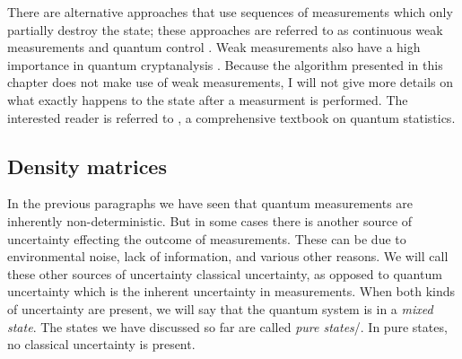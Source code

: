 There are alternative approaches that use sequences of measurements which only partially destroy the state; these approaches are referred to as continuous weak measurements and quantum control \citep{Smith2006}. Weak measurements also have a high importance in quantum cryptanalysis \citep{Pryde2004}. Because the algorithm presented in this chapter does not make use of weak measurements, I will not give more details on what exactly happens to the state after a measurment is performed. The interested reader is referred to \citep{Petz2008}, a comprehensive textbook on quantum statistics.

\subsection{Density matrices}

In the previous paragraphs we have seen that quantum measurements are inherently non-deterministic. But in some cases there is another source of uncertainty effecting the outcome of measurements. These can be due to environmental noise, lack of information, and various other reasons. We will call these other sources of uncertainty classical uncertainty, as opposed to quantum uncertainty which is the inherent uncertainty in measurements. When both kinds of uncertainty are present, we will say that the quantum system is in a \emph{mixed state}. The states we have discussed so far are called \emph{pure states}/. In pure states, no classical uncertainty is present.


